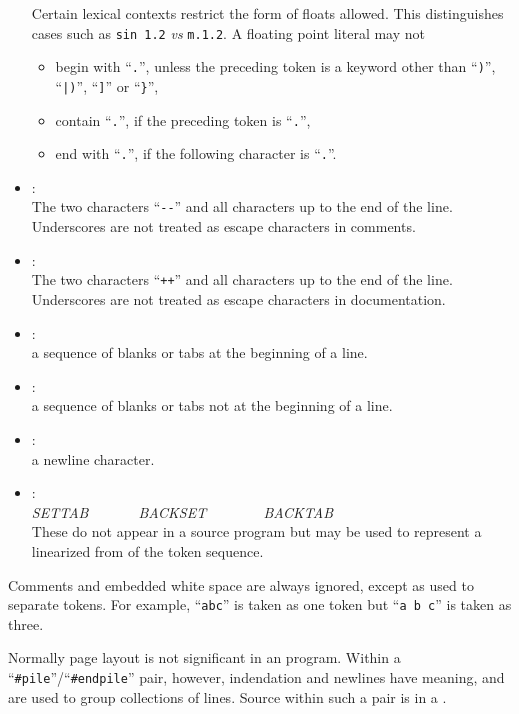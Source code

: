 \begin{itemize}
Certain lexical contexts restrict the form of floats allowed.
This distinguishes cases such as \verb'sin 1.2' {\it vs} \verb'm.1.2'.
A floating point literal may not
\begin{itemize}
\item 
begin with ``\verb"."'', unless the preceding token is a keyword
other than ``\verb")"'', ``\verb"|)"'', ``\verb"]"'' or ``\verb"}"'',
\item
contain ``\verb"."'', if the preceding token is ``\verb"."'',
\item
end with ``\verb"."'', if the following character is ``\verb"."''.
\end{itemize}
%
\item {}:
\\
The two characters ``\verb'--''' and all characters up to the end of the line.
Underscores are not treated as escape characters in comments.
%
\item {}: 
\\
The two characters ``\verb'++''' and all characters up to the end of the line.
Underscores are not treated as escape characters in documentation.
%
\item {}:
\\
a sequence of blanks or tabs at the beginning of a line.
%
\item {}:
\\
a sequence of blanks or tabs not at the beginning of a line.
%
\item {}:
\\
a newline character.
%
\item {}:
\\
{\it SETTAB}\verb"       "{\it BACKSET}\verb"        "{\it BACKTAB}
\\
These do not appear in a source program but may be used
to represent a linearized from of the token sequence.
\end{itemize}
Comments and embedded white space are always ignored, except as used to 
separate tokens.  
For example, ``\verb"abc"'' is taken as one token but ``\verb"a b c"''
is taken as three.

Normally page layout is not significant in an \asharp{} program.
Within a ``\verb"#pile"''/``\verb"#endpile"'' pair, however,
indendation and newlines have meaning,
and are used to group collections of lines.
Source within such a pair is in a .

